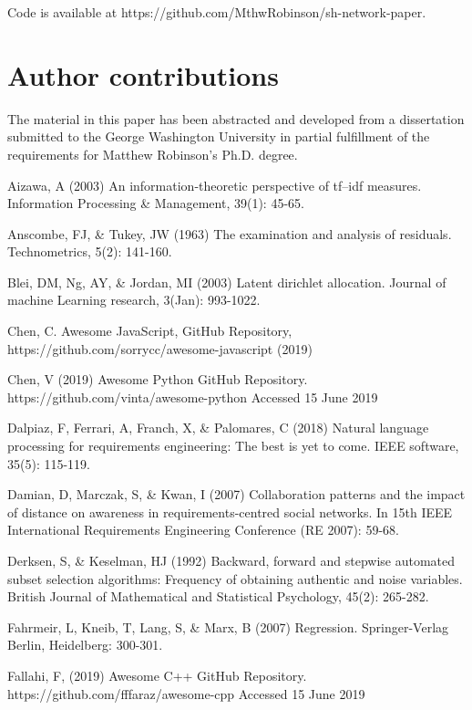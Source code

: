 Code is available at https://github.com/MthwRobinson/sh-network-paper.

\section*{Author contributions}

The material in this paper has been abstracted and developed from a dissertation submitted to the  George Washington University in partial fulfillment of the requirements for Matthew Robinson's Ph.D. degree.

\begin{thebibliography}{}

Aizawa, A (2003) An information-theoretic perspective of tf–idf measures. Information Processing \& Management, 39(1): 45-65.

Anscombe, FJ, \& Tukey, JW (1963) The examination and analysis of residuals. Technometrics, 5(2): 141-160.

Blei, DM, Ng, AY, \& Jordan, MI (2003) Latent dirichlet allocation. Journal of machine Learning research, 3(Jan): 993-1022.

Chen, C. Awesome JavaScript, GitHub Repository, https://github.com/sorrycc/awesome-javascript (2019)

Chen, V (2019) Awesome Python GitHub Repository. https://github.com/vinta/awesome-python Accessed 15 June 2019

Dalpiaz, F, Ferrari, A, Franch, X, \& Palomares, C (2018) Natural language processing for requirements engineering: The best is yet to come. IEEE software, 35(5): 115-119.

Damian, D, Marczak, S, \& Kwan, I (2007) Collaboration patterns and the impact of distance on awareness in requirements-centred social networks. In 15th IEEE International Requirements Engineering Conference (RE 2007): 59-68.

Derksen, S, \& Keselman, HJ (1992) Backward, forward and stepwise automated subset selection algorithms: Frequency of obtaining authentic and noise variables. British Journal of Mathematical and Statistical Psychology, 45(2): 265-282.

Fahrmeir, L, Kneib, T, Lang, S, \& Marx, B (2007) Regression. Springer-Verlag Berlin, Heidelberg: 300-301.

Fallahi, F, (2019) Awesome C++ GitHub Repository. https://github.com/fffaraz/awesome-cpp Accessed 15 June 2019


\end{thebibliography}
